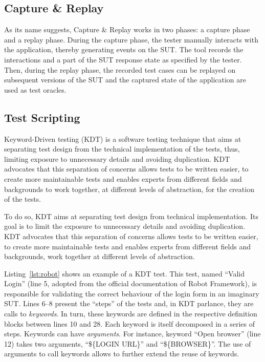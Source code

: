 \subsection{Capture \& Replay}
\label{sec:introduction-capture-and-replay}

As its name suggests, Capture \& Replay works in two phases: a capture phase and a replay phase. During the capture phase, the tester manually interacts with the application, thereby generating events on the SUT. The tool records the interactions and a part of the SUT response state as specified by the tester. Then, during the replay phase, the recorded test cases can be replayed on subsequent versions of the SUT and the captured state of the application are used as test oracles.

\subsection{Test Scripting}
\label{sec:introduction-test-scripting}

Keyword-Driven testing (KDT) is a software testing technique that aims at separating test design from the technical implementation of the tests, thus, limiting exposure to unnecessary details and avoiding duplication. KDT advocates that this separation of concerns allows tests to be written easier, to create more maintainable tests and enables experts from different fields and backgrounds to work together, at different levels of abstraction, for the creation of the tests.

To do so, KDT\cite{Tang2008} aims at separating test design from technical implementation. Its goal is to limit the exposure to unnecessary details and avoiding duplication. KDT advocates that this separation of concerns allows tests to be written easier, to create more maintainable tests and enables experts from different fields and backgrounds, work together at different levels of abstraction. 

Listing~\ref{lst:robot} shows an example of a KDT test. This test, named ``Valid Login'' (line 5, adopted from the official documentation of Robot Framework), is responsible for validating the correct behaviour of the login form in an imaginary SUT. Lines 6--8 present the ``steps'' of the tests and, in KDT parlance, they are calls to \emph{keywords}. In turn, these keywords are defined in the respective definition blocks between lines 10 and 28. Each keyword is itself decomposed in a series of steps. Keywords can have \emph{arguments}. For instance, keyword ``Open browser'' (line 12) takes two arguments, ``\$\{LOGIN URL\}'' and ``\$\{BROWSER\}''. The use of arguments to call keywords allows to further extend the reuse of keywords.


